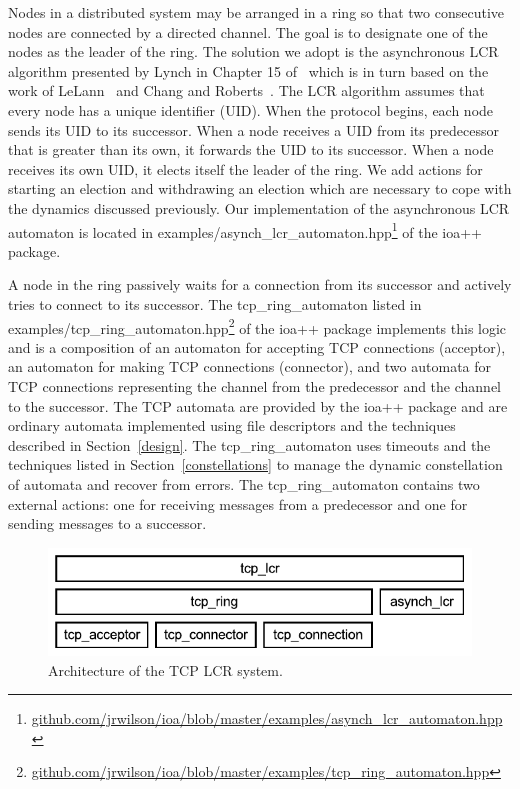 Nodes in a distributed system may be arranged in a ring so that two consecutive nodes are connected by a directed channel.
The goal is to designate one of the nodes as the leader of the ring.
The solution we adopt is the asynchronous LCR algorithm presented by Lynch in Chapter 15 of~\cite{lynch1996distributed} which is in turn based on the work of LeLann~\cite{le1977distributed} and Chang and Roberts~\cite{chang1979improved}.
The LCR algorithm assumes that every node has a unique identifier (UID).
When the protocol begins, each node sends its UID to its successor.
When a node receives a UID from its predecessor that is greater than its own, it forwards the UID to its successor.
When a node receives its own UID, it elects itself the leader of the ring.
We add actions for starting an election and withdrawing an election which are necessary to cope with the dynamics discussed previously.
Our implementation of the asynchronous LCR automaton is located in examples/asynch\_lcr\_automaton.hpp\footnote{\url{github.com/jrwilson/ioa/blob/master/examples/asynch_lcr_automaton.hpp}} of the ioa++ package.

A node in the ring passively waits for a connection from its successor and actively tries to connect to its successor.
The tcp\_ring\_automaton listed in examples/tcp\_ring\_automaton.hpp\footnote{\url{github.com/jrwilson/ioa/blob/master/examples/tcp_ring_automaton.hpp}} of the ioa++ package implements this logic and is a composition of an automaton for accepting TCP connections (acceptor), an automaton for making TCP connections (connector), and two automata for TCP connections representing the channel from the predecessor and the channel to the successor.
The TCP automata are provided by the ioa++ package and are ordinary automata implemented using file descriptors and the techniques described in Section~\ref{design}.
The tcp\_ring\_automaton uses timeouts and the techniques listed in Section~\ref{constellations} to manage the dynamic constellation of automata and recover from errors.
The tcp\_ring\_automaton contains two external actions:  one for receiving messages from a predecessor and one for sending messages to a successor.

\begin{figure}
\center
\includegraphics[width=\columnwidth]{tcp_lcr_automaton}
\caption{Architecture of the TCP LCR system.}
\label{tcp_lcr_automaton}
\end{figure}

